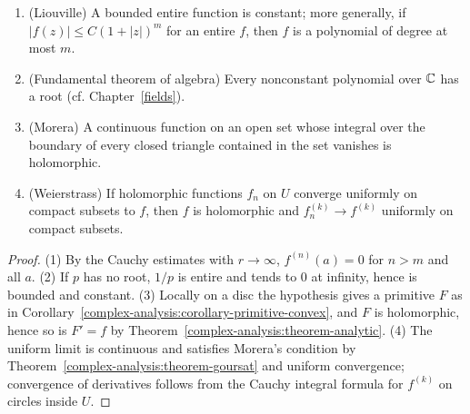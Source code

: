 \begin{corollary}\label{complex-analysis:corollary-liouville}
\begin{enumerate}
\item (Liouville) A bounded entire function is constant; more generally, if $|f(z)| \leq C(1 + |z|)^m$ for an entire $f$, then $f$ is a polynomial of degree at most $m$.
\item (Fundamental theorem of algebra) Every nonconstant polynomial over $\mathbb{C}$ has a root (cf. Chapter~\ref{fields}).
\item (Morera) A continuous function on an open set whose integral over the boundary of every closed triangle contained in the set vanishes is holomorphic.
\item (Weierstrass) If holomorphic functions $f_n$ on $U$ converge uniformly on compact subsets to $f$, then $f$ is holomorphic and $f_n^{(k)} \to f^{(k)}$ uniformly on compact subsets.
\end{enumerate}
\end{corollary}

\begin{proof}
(1) By the Cauchy estimates with $r \to \infty$, $f^{(n)}(a) = 0$ for $n > m$ and all $a$. (2) If $p$ has no root, $1/p$ is entire and tends to $0$ at infinity, hence is bounded and constant. (3) Locally on
a disc the hypothesis gives a primitive $F$ as in Corollary~\ref{complex-analysis:corollary-primitive-convex}, and $F$ is holomorphic, hence so is $F' = f$ by
Theorem~\ref{complex-analysis:theorem-analytic}. (4) The uniform limit is continuous and satisfies Morera's condition by Theorem~\ref{complex-analysis:theorem-goursat} and uniform convergence; convergence
of derivatives follows from the Cauchy integral formula for $f^{(k)}$ on circles inside $U$.
\end{proof}

